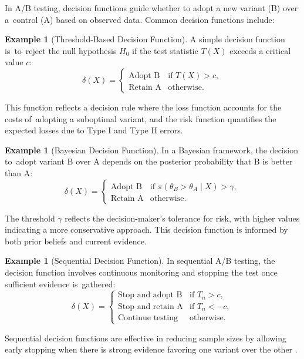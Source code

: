 \documentclass[magisterska, english]{pwr_wmat_praca_dyplomowa}
\theoremstyle{plain}
\numberwithin{theorem}{chapter}
\theoremstyle{definition}
\numberwithin{theorem}{chapter}
\newtheorem{example}[theorem]{Example}
\begin{document}
In A/B testing, decision functions guide whether to adopt a new variant (B) over a~control (A) based on observed data. Common decision functions include:

\begin{example}[Threshold-Based Decision Function]
	A simple decision function is~to~reject the null hypothesis \( H_0 \) if the test statistic \( T(X) \) exceeds a critical value \( c \):
	\[
	\delta(X) = 
	\begin{cases} 
		\text{Adopt B} & \text{if } T(X) > c, \\
		\text{Retain A} & \text{otherwise}.
	\end{cases}
	\]
\end{example}

This function reflects a decision rule where the loss function accounts for the costs of~adopting a suboptimal variant, and the risk function quantifies the expected losses due to Type I and Type II errors.

\begin{example}[Bayesian Decision Function]
	In a Bayesian framework, the decision to~adopt variant B over A depends on the posterior probability that B is better than A:
	\[
	\delta(X) = 
	\begin{cases} 
		\text{Adopt B} & \text{if } \pi(\theta_B > \theta_A \mid X) > \gamma, \\
		\text{Retain A} & \text{otherwise}.
	\end{cases}
	\]
\end{example}

The threshold \( \gamma \) reflects the decision-maker’s tolerance for risk, with higher values indicating a more conservative approach. This decision function is informed by both prior beliefs and current evidence.

\begin{example}[Sequential Decision Function]
	In sequential A/B testing, the decision function involves continuous monitoring and stopping the test once sufficient evidence is~gathered:
	\[
	\delta(X) = 
	\begin{cases} 
		\text{Stop and adopt B} & \text{if } T_n > c, \\
		\text{Stop and retain A} & \text{if } T_n < -c, \\
		\text{Continue testing} & \text{otherwise}.
	\end{cases}
	\]
\end{example}

Sequential decision functions are effective in reducing sample sizes by allowing early stopping when there is strong evidence favoring one variant over the other \cite{wald2004sequential}.
\end{document}
